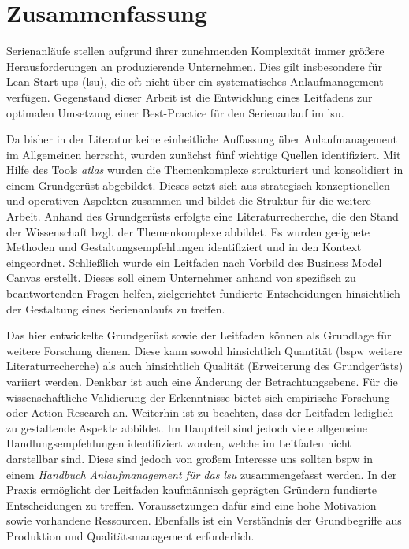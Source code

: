 \chapter*{Zusammenfassung}
Serienanläufe stellen aufgrund ihrer zunehmenden Komplexität immer größere Herausforderungen an produzierende Unternehmen. Dies gilt insbesondere für Lean Start-ups (\gls{lsu}), die oft nicht über ein systematisches Anlaufmanagement verfügen.
Gegenstand dieser Arbeit ist die Entwicklung eines Leitfadens zur optimalen Umsetzung einer Best-Practice für den Serienanlauf im \gls{lsu}.

Da bisher in der Literatur keine einheitliche Auffassung über Anlaufmanagement im Allgemeinen herrscht, wurden zunächst fünf wichtige Quellen identifiziert. Mit Hilfe des Tools \textit{\gls{atlas}} wurden die Themenkomplexe strukturiert und konsolidiert in einem Grundgerüst abgebildet. Dieses setzt sich aus strategisch konzeptionellen und operativen Aspekten zusammen und bildet die Struktur für die weitere Arbeit. 
Anhand des Grundgerüsts erfolgte eine Literaturrecherche, die den Stand der Wissenschaft bzgl. der Themenkomplexe abbildet. Es wurden geeignete Methoden und Gestaltungsempfehlungen identifiziert und in den Kontext eingeordnet. 
Schließlich wurde ein Leitfaden nach Vorbild des Business Model Canvas erstellt. Dieses soll einem Unternehmer anhand von spezifisch zu beantwortenden Fragen helfen, zielgerichtet fundierte Entscheidungen hinsichtlich der Gestaltung eines Serienanlaufs zu treffen. 
% 

Das hier entwickelte Grundgerüst sowie der Leitfaden können als Grundlage für weitere Forschung dienen. Diese kann sowohl hinsichtlich Quantität (\gls{bspw} weitere Literaturrecherche) als auch hinsichtlich Qualität (Erweiterung des Grundgerüsts) variiert werden. Denkbar ist auch eine Änderung der Betrachtungsebene. Für die wissenschaftliche Validierung der Erkenntnisse bietet sich empirische Forschung oder Ac­tion-Re­search an. 
Weiterhin ist zu beachten, dass der Leitfaden lediglich zu gestaltende Aspekte abbildet. Im Hauptteil sind jedoch viele allgemeine Handlungsempfehlungen identifiziert worden, welche im Leitfaden nicht darstellbar sind. Diese sind jedoch von großem Interesse uns sollten \gls{bspw} in einem \textit{Handbuch Anlaufmanagement für das \gls{lsu}} zusammengefasst werden.
% 
In der Praxis ermöglicht der Leitfaden kaufmännisch geprägten Gründern fundierte Entscheidungen zu treffen. Voraussetzungen dafür sind eine hohe Motivation sowie vorhandene Ressourcen. Ebenfalls ist ein Verständnis der Grundbegriffe aus Produktion und Qualitätsmanagement erforderlich. 

